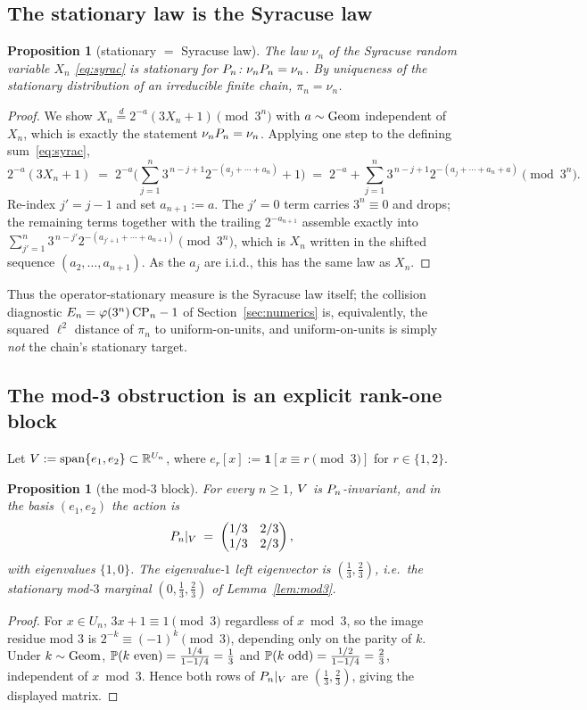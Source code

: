 \documentclass[11pt]{amsart}
\newtheorem{proposition}[theorem]{Proposition}
\theoremstyle{definition}
\theoremstyle{remark}
\begin{document}
\subsection{The stationary law is the Syracuse law}
\begin{proposition}[stationary $=$ Syracuse law]\label{prop:stationary}
The law $\nu_n$ of the Syracuse random variable $X_n$ \eqref{eq:syrac} is stationary for $P_n$:
$\nu_nP_n=\nu_n$. By uniqueness of the stationary distribution of an irreducible finite chain,
$\pi_n=\nu_n$.
\end{proposition}
\begin{proof}
We show $X_n\stackrel{d}{=}2^{-a}(3X_n+1)\pmod{3^n}$ with $a\sim\operatorname{Geom}$ independent of $X_n$, which is
exactly the statement $\nu_nP_n=\nu_n$. Applying one step to the defining sum~\eqref{eq:syrac},
\[
   2^{-a}(3X_n+1)\;=\;2^{-a}\!\Big(\sum_{j=1}^n 3^{\,n-j+1}2^{-(a_j+\cdots+a_n)}+1\Big)
   \;=\;2^{-a}+\sum_{j=1}^n 3^{\,n-j+1}2^{-(a_j+\cdots+a_n+a)}\pmod{3^n}.
\]
Re-index $j'=j-1$ and set $a_{n+1}:=a$. The $j'=0$ term carries $3^n\equiv0$ and drops; the
remaining terms together with the trailing $2^{-a_{n+1}}$ assemble exactly into
$\sum_{j'=1}^n 3^{\,n-j'}2^{-(a_{j'+1}+\cdots+a_{n+1})}\pmod{3^n}$, which is $X_n$ written in the
shifted sequence $(a_2,\dots,a_{n+1})$. As the $a_j$ are i.i.d., this has the same law as $X_n$.
\end{proof}

Thus the operator-stationary measure is the Syracuse law itself; the collision diagnostic
$E_n=\varphi(3^n)\,\mathrm{CP}_n-1$ of Section~\ref{sec:numerics} is, equivalently, the squared $\ell^2$
distance of $\pi_n$ to uniform-on-units, and uniform-on-units is simply \emph{not} the chain's
stationary target.

\subsection{The mod-3 obstruction is an explicit rank-one block}
Let $V:=\mathrm{span}\{e_1,e_2\}\subset\mathbb{R}^{U_n}$, where $e_r[x]:=\mathbf{1}[x\equiv r\pmod3]$ for
$r\in\{1,2\}$.

\begin{proposition}[the mod-$3$ block]\label{prop:mod3block}
For every $n\ge1$, $V$ is $P_n$-invariant, and in the basis $(e_1,e_2)$ the action is
\[
   P_n|_{V}\;=\;\begin{pmatrix} 1/3 & 2/3 \\ 1/3 & 2/3 \end{pmatrix},
\]
with eigenvalues $\{1,0\}$. The eigenvalue-$1$ left eigenvector is $(\tfrac13,\tfrac23)$, i.e.\ the
stationary mod-$3$ marginal $(0,\tfrac13,\tfrac23)$ of Lemma~\ref{lem:mod3}.
\end{proposition}
\begin{proof}
For $x\in U_n$, $3x+1\equiv1\pmod3$ regardless of $x\bmod3$, so the image residue mod $3$ is
$2^{-k}\equiv(-1)^k\pmod3$, depending only on the parity of $k$. Under $k\sim\operatorname{Geom}$,
$\mathbb{P}(k\text{ even})=\tfrac{1/4}{1-1/4}=\tfrac13$ and $\mathbb{P}(k\text{ odd})=\tfrac{1/2}{1-1/4}=\tfrac23$,
independent of $x\bmod3$. Hence both rows of $P_n|_{V}$ are $(\tfrac13,\tfrac23)$, giving the
displayed matrix.
\end{proof}
\end{document}

